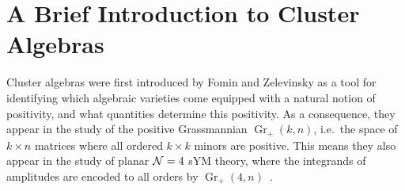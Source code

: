 \documentclass[11pt]{article}
\DeclareMathOperator{\Gr}{Gr}
\begin{document}





\section{A Brief Introduction to Cluster Algebras} \label{sec:brief_intro}

Cluster algebras were first introduced by Fomin and Zelevinsky \cite{1021.16017} as a tool for identifying which algebraic varieties come equipped with a natural notion of positivity, and what quantities determine this positivity. As a consequence, they appear in the study of the positive Grassmannian $\Gr_{+}(k,n)$, i.e.~the space of $k\times n$ matrices where all ordered $k\times k$ minors are positive. This means they also appear in the study of planar ${\cal N} = 4$ sYM theory, where the integrands of amplitudes are encoded to all orders by $\Gr_+(4,n)$~\cite{ArkaniHamed:2012nw}.
\end{document}
